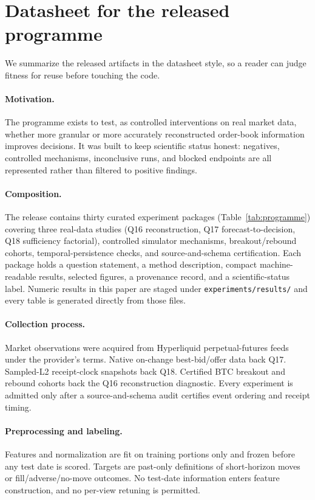 \section{Datasheet for the released programme}
\label{app:datasheet}

We summarize the released artifacts in the datasheet style, so a reader can judge fitness for
reuse before touching the code.

\paragraph{Motivation.} The programme exists to test, as controlled interventions on real
market data, whether more granular or more accurately reconstructed order-book information
improves decisions. It was built to keep scientific status honest: negatives, controlled
mechanisms, inconclusive runs, and blocked endpoints are all represented rather than filtered
to positive findings.

\paragraph{Composition.} The release contains thirty curated experiment packages
(Table~\ref{tab:programme}) covering three real-data studies (Q16 reconstruction, Q17
forecast-to-decision, Q18 sufficiency factorial), controlled simulator mechanisms,
breakout/rebound cohorts, temporal-persistence checks, and source-and-schema certification.
Each package holds a question statement, a method description, compact machine-readable
results, selected figures, a provenance record, and a scientific-status label. Numeric results
in this paper are staged under \texttt{experiments/results/} and every table is generated
directly from those files.

\paragraph{Collection process.} Market observations were acquired from Hyperliquid
perpetual-futures feeds under the provider's terms. Native on-change best-bid/offer data back
Q17. Sampled-L2 receipt-clock snapshots back Q18. Certified BTC breakout and rebound cohorts
back the Q16 reconstruction diagnostic. Every experiment is admitted only after a
source-and-schema audit certifies event ordering and receipt timing.

\paragraph{Preprocessing and labeling.} Features and normalization are fit on training portions
only and frozen before any test date is scored. Targets are past-only definitions of
short-horizon moves or fill/adverse/no-move outcomes. No test-date information enters feature
construction, and no per-view retuning is permitted.

